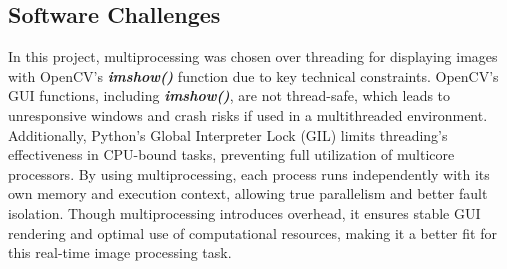 \subsection{Software Challenges}
In this project, multiprocessing was chosen over threading for displaying images with OpenCV's \textbf{\textit{imshow()}} function due to key technical constraints. OpenCV's GUI functions, including \textbf{\textit{imshow()}}, are not thread-safe, which leads to unresponsive windows and crash risks if used in a multithreaded environment. Additionally, Python's Global Interpreter Lock (GIL) limits threading's effectiveness in CPU-bound tasks, preventing full utilization of multicore processors. By using multiprocessing, each process runs independently with its own memory and execution context, allowing true parallelism and better fault isolation. Though multiprocessing introduces overhead, it ensures stable GUI rendering and optimal use of computational resources, making it a better fit for this real-time image processing task.